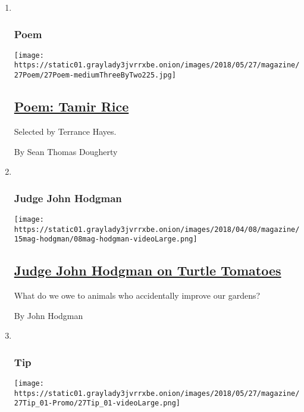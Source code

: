 \begin{enumerate}
\def\labelenumi{\arabic{enumi}.}
\item ~
  \hypertarget{poem}{%
  \subsubsection{Poem}\label{poem}}

  \texttt{[image: https://static01.graylady3jvrrxbe.onion/images/2018/05/27/magazine/27Poem/27Poem-mediumThreeByTwo225.jpg]}

  \hypertarget{poem-tamir-rice}{%
  \subsection{\texorpdfstring{\href{/2018/05/24/magazine/poem-tamir-rice.html}{Poem:
  Tamir Rice}}{Poem: Tamir Rice}}\label{poem-tamir-rice}}

  Selected by Terrance Hayes.

  By Sean Thomas Dougherty
\item ~
  \hypertarget{judge-john-hodgman}{%
  \subsubsection{Judge John Hodgman}\label{judge-john-hodgman}}

  \texttt{[image: https://static01.graylady3jvrrxbe.onion/images/2018/04/08/magazine/15mag-hodgman/08mag-hodgman-videoLarge.png]}

  \hypertarget{judge-john-hodgman-on-turtle-tomatoes}{%
  \subsection{\texorpdfstring{\href{/2018/05/24/magazine/judge-john-hodgman-on-turtle-tomatoes.html}{Judge
  John Hodgman on Turtle
  Tomatoes}}{Judge John Hodgman on Turtle Tomatoes}}\label{judge-john-hodgman-on-turtle-tomatoes}}

  What do we owe to animals who accidentally improve our gardens?

  By John Hodgman
\item ~
  \hypertarget{tip}{%
  \subsubsection{Tip}\label{tip}}

  \texttt{[image: https://static01.graylady3jvrrxbe.onion/images/2018/05/27/magazine/27Tip\_01-Promo/27Tip\_01-videoLarge.png]}


\end{enumerate}
